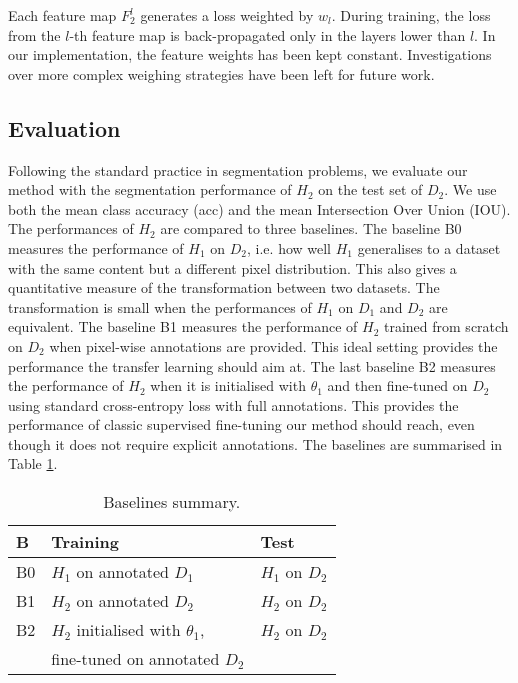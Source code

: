 \documentclass{bmvc2k}
\begin{document}
Each feature map $F^l_2$ generates a loss weighted by $w_l$. 
During training, the loss from the $l$-th feature map is back-propagated only 
in the layers lower than $l$. In our implementation, the feature weights has
been kept constant. Investigations over more complex weighing strategies have been left
for future work.

\subsection{Evaluation}

Following the standard practice in segmentation problems, we evaluate our method with the segmentation performance of $H_2$ on 
the test set of $D_2$. We use both the mean class accuracy (acc) and the mean 
Intersection Over Union (IOU).
The performances of $H_2$ are compared to three baselines. 
The baseline B0 
measures the performance of $H_1$ on $D_2$, i.e. how well $H_1$ 
generalises to a dataset with the same content but a different pixel distribution. 
This also gives a quantitative measure of the transformation between two datasets.
The transformation is small when the performances of $H_1$ on $D_1$ and $D_2$ are equivalent.
The baseline B1 measures the performance of $H_2$ trained from scratch 
on $D_2$ when 
pixel-wise annotations are provided. This ideal setting provides the performance 
the transfer learning should aim at.
The last baseline B2 measures the performance of $H_2$ when it is initialised 
with $\theta_1$ and then fine-tuned on $D_2$ using standard cross-entropy loss with full annotations. This provides the performance of 
classic supervised fine-tuning our method should reach, even though it does not require explicit annotations. The baselines are summarised in Table \ref{tab:baselines}.

\begin{table}
\label{tab:baselines}
\begin{center}
\begin{tabular}{|l|l|l|}
\hline
  B & Training & Test \\
\hline
  B0 & $H_1$ on annotated $D_1$ & $H_1$ on $D_2$ \\
\hline
  B1 & $H_2$ on annotated $D_2$ & $H_2$ on $D_2$ \\
\hline
  B2 & $H_2$ initialised with $\theta_1$,  & $H_2$ on $D_2$ \\
     & fine-tuned on annotated $D_2$ &                         \\
\hline          
\end{tabular}
\end{center}
  \caption{Baselines summary.} 
\end{table}
\end{document}

